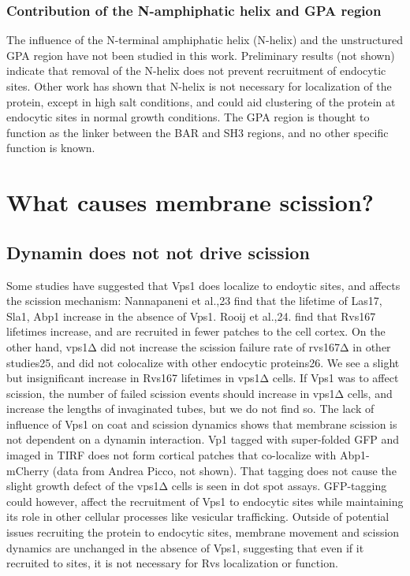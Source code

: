 \subsubsection{Contribution of the N-amphiphatic helix and GPA region}
The influence of the N-terminal amphiphatic helix (N-helix) and the unstructured GPA region have not been studied in this work. Preliminary results (not shown) indicate that removal of the N-helix does not prevent recruitment of endocytic sites. Other work has shown that N-helix is not necessary for localization of the protein, except in high salt conditions, and could aid clustering of the protein at endocytic sites in normal growth conditions. The GPA region is thought to function as the linker between the BAR and SH3 regions, and no other specific function is known. 

\section{What causes membrane scission?}


\subsection{Dynamin does not not drive scission}
Some studies have suggested that Vps1 does localize to endoytic sites, and affects the scission mechanism: Nannapaneni et al.,23 find that the lifetime of Las17, Sla1, Abp1 increase in the absence of Vps1. Rooij et al.,24. find that Rvs167 lifetimes increase, and are recruited in fewer patches to the cell cortex. On the other hand, vps1Δ did not increase the scission failure rate of rvs167Δ in other studies25, and did not colocalize with other endocytic proteins26. We see a slight but insignificant increase in Rvs167 lifetimes in vps1Δ cells. If Vps1 was to affect scission, the number of failed scission events should increase in vps1Δ cells, and increase the lengths of invaginated tubes, but we do not find so. The lack of influence of Vps1 on coat and scission dynamics shows that membrane scission is not dependent on a dynamin interaction. Vp1 tagged with super-folded GFP and imaged in TIRF does not form cortical patches that co-localize with Abp1-mCherry (data from Andrea Picco, not shown). That tagging does not cause the slight growth defect of the vps1Δ cells is seen in dot spot assays. GFP-tagging could however, affect the recruitment of Vps1 to endocytic sites while maintaining its role in other cellular processes like vesicular trafficking. Outside of potential issues recruiting the protein to endocytic sites, membrane movement and scission dynamics are unchanged in the absence of Vps1, suggesting that even if it recruited to sites, it is not necessary for Rvs localization or function. 


